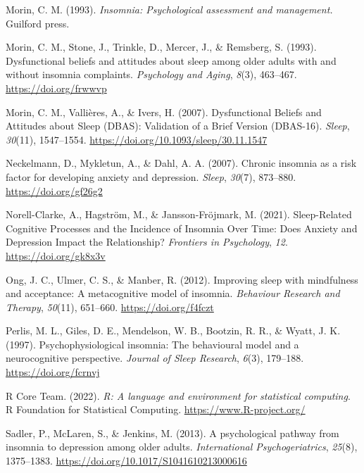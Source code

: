 \documentclass[
  ,doc,11pt, twoside,floatsintext]{apa6}
\newlength{\cslhangindent}
\newlength{\cslentryspacingunit} %
\newenvironment{CSLReferences}[2] %
 {%
  \setlength{\parindent}{0pt}
  \ifodd #1
  \let\oldpar\par
  \def\par{\hangindent=\cslhangindent\oldpar}
  \fi
  \setlength{\parskip}{#2\cslentryspacingunit}
 }%
 {}
\begin{document}
\begin{CSLReferences}{1}{0}
\leavevmode{}%
Morin, C. M. (1993). \emph{Insomnia: Psychological assessment and management.} Guilford press.

\leavevmode{}%
Morin, C. M., Stone, J., Trinkle, D., Mercer, J., \& Remsberg, S. (1993). Dysfunctional beliefs and attitudes about sleep among older adults with and without insomnia complaints. \emph{Psychology and Aging}, \emph{8}(3), 463--467. \url{https://doi.org/frwwvp}

\leavevmode{}%
Morin, C. M., Vallières, A., \& Ivers, H. (2007). Dysfunctional {Beliefs} and {Attitudes} about {Sleep} ({DBAS}): {Validation} of a {Brief Version} ({DBAS-16}). \emph{Sleep}, \emph{30}(11), 1547--1554. \url{https://doi.org/10.1093/sleep/30.11.1547}

\leavevmode{}%
Neckelmann, D., Mykletun, A., \& Dahl, A. A. (2007). Chronic insomnia as a risk factor for developing anxiety and depression. \emph{Sleep}, \emph{30}(7), 873--880. \url{https://doi.org/gf26g2}

\leavevmode{}%
Norell-Clarke, A., Hagström, M., \& Jansson-Fröjmark, M. (2021). Sleep-{Related Cognitive Processes} and the {Incidence} of {Insomnia Over Time}: {Does Anxiety} and {Depression Impact} the {Relationship}? \emph{Frontiers in Psychology}, \emph{12}. \url{https://doi.org/gk8x3v}

\leavevmode{}%
Ong, J. C., Ulmer, C. S., \& Manber, R. (2012). Improving sleep with mindfulness and acceptance: {A} metacognitive model of insomnia. \emph{Behaviour Research and Therapy}, \emph{50}(11), 651--660. \url{https://doi.org/f4fczt}

\leavevmode{}%
Perlis, M. L., Giles, D. E., Mendelson, W. B., Bootzin, R. R., \& Wyatt, J. K. (1997). Psychophysiological insomnia: The behavioural model and a neurocognitive perspective. \emph{Journal of Sleep Research}, \emph{6}(3), 179--188. \url{https://doi.org/fcrnvj}

\leavevmode{}%
R Core Team. (2022). \emph{R: A language and environment for statistical computing}. R Foundation for Statistical Computing. \url{https://www.R-project.org/}

\leavevmode{}%
Sadler, P., McLaren, S., \& Jenkins, M. (2013). A psychological pathway from insomnia to depression among older adults. \emph{International Psychogeriatrics}, \emph{25}(8), 1375--1383. \url{https://doi.org/10.1017/S1041610213000616}


\end{CSLReferences}
\end{document}
